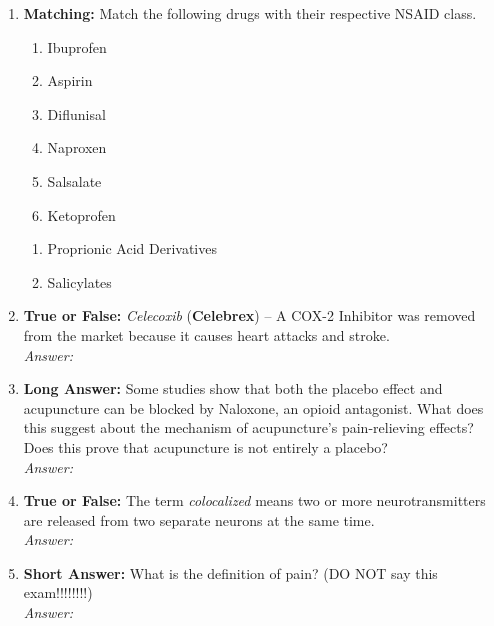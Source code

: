 \begin{enumerate}[label=\textbf{Q3.2.\arabic*}]
    \item \textbf{Matching:} Match the following drugs with their respective NSAID class.
    \begin{wordbox}
        \begin{enumerate}
            \item Ibuprofen
            \item Aspirin
            \item Diflunisal
            \item Naproxen
            \item Salsalate
            \item Ketoprofen
        \end{enumerate}
    \end{wordbox}
    \begin{enumerate}[label=(\arabic*)]
        \item Proprionic Acid Derivatives \quad \dotfill \quad \underline{\hspace{4cm}}
        \item Salicylates \quad \dotfill \quad \underline{\hspace{4cm}}
    \end{enumerate}

    \item \textbf{True or False:} \textit{Celecoxib} (\textbf{Celebrex}) -- A COX-2 Inhibitor was removed from the market because it causes heart attacks and stroke. \\
        \textit{Answer:} %

    \item \textbf{Long Answer:} Some studies show that both the placebo effect and acupuncture can be blocked by Naloxone, an opioid antagonist. What does this suggest about the mechanism of acupuncture’s pain-relieving effects? Does this prove that acupuncture is not entirely a placebo? \\
        \textit{Answer:} \\[2cm] %
    
    \item \textbf{True or False:} The term \textit{colocalized} means two or more neurotransmitters are released from two separate neurons at the same time. \\ 
        \textit{Answer:} %

    \item \textbf{Short Answer:} What is the definition of pain? (DO NOT say this exam!!!!!!!!) \\
        \textit{Answer:} %
\end{enumerate}

